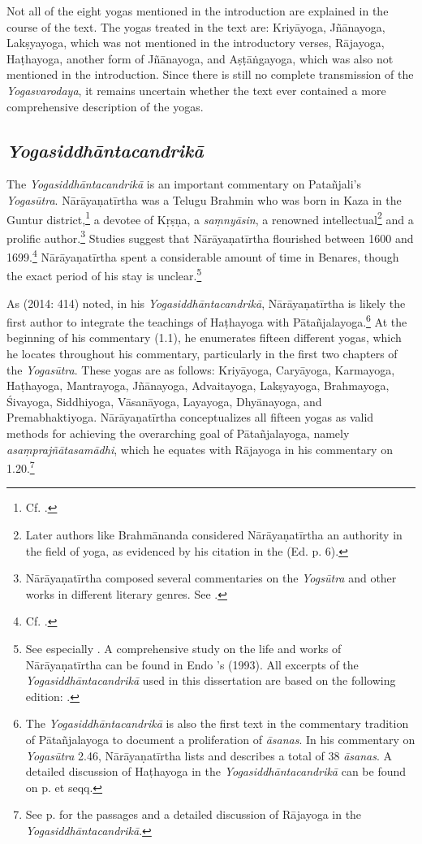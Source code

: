 Not all of the eight yogas mentioned in the introduction are explained in the course of the text. The yogas treated in the text are: Kriyāyoga, Jñānayoga, Lakṣyayoga, which was not mentioned in the introductory verses, Rājayoga, Haṭhayoga, another form of Jñānayoga, and Aṣṭāṅgayoga, which was also not mentioned in the introduction. Since there is still no complete transmission of the \emph{Yogasvarodaya}, it remains uncertain whether the text ever contained a more comprehensive description of the yogas.

\subsection{\emph{Yogasiddhāntacandrikā}}

The \emph{Yogasiddhāntacandrikā} is an important commentary on Patañjali's \emph{Yogasūtra}. Nārāyaṇatīrtha was a Telugu Brahmin who was born in Kaza in the Guntur district,\footnote{Cf. \citeauthor[1993: 43]{endo1993}.} a devotee of Kṛṣṇa, a \textit{saṃnyāsin}, a renowned intellectual\footnote{Later authors like Brahmānanda considered Nārāyaṇatīrtha an authority in the field of yoga, as evidenced by his citation in the  (Ed. p. 6).} and a prolific author.\footnote{Nārāyaṇatīrtha composed several commentaries on the \emph{Yogsūtra} and other works in different literary genres. See \citeauthor[2004: 20-21]{penna2004}.} Studies suggest that Nārāyaṇatīrtha flourished between 1600 and 1699.\footnote{Cf. \citeauthor[1993: 56]{endo1993}.} Nārāyaṇatīrtha spent a considerable amount of time in Benares, though the exact period of his stay is unclear.\footnote{See especially \citeauthor[2004: 24]{penna2004}. A comprehensive study on the life and works of Nārāyaṇatīrtha can be found in Endo \citeauthor{endo1993}'s  (1993). All excerpts of the \emph{Yogasiddhāntacandrikā} used in this dissertation are based on the following edition: .}

As \citeauthor{birch2014} (2014: 414) noted, in his \emph{Yogasiddhāntacandrikā}, Nārāyaṇatīrtha is likely the first author to integrate the teachings of Haṭhayoga with Pātañjalayoga.\footnote{The \emph{Yogasiddhāntacandrikā} is also the first text in the commentary tradition of Pātañjalayoga to document a proliferation of \textit{āsanas}. In his commentary on \emph{Yogasūtra} 2.46, Nārāyaṇatīrtha lists and describes a total of 38 \textit{āsanas}. A detailed discussion of Haṭhayoga in the \emph{Yogasiddhāntacandrikā} can be found on p. \pageref{hathacandrika} et seqq.} At the beginning of his commentary (1.1), he enumerates fifteen different yogas, which he locates throughout his commentary, particularly in the first two chapters of the \emph{Yogasūtra}. These yogas are as follows: Kriyāyoga, Caryāyoga, Karmayoga, Haṭhayoga, Mantrayoga, Jñānayoga, Advaitayoga, Lakṣyayoga, Brahmayoga, Śivayoga, Siddhiyoga, Vāsanāyoga, Layayoga, Dhyānayoga, and Premabhaktiyoga. Nārāyaṇatīrtha conceptualizes all fifteen yogas as valid methods for achieving the overarching goal of Pātañjalayoga, namely \textit{asaṃprajñātasamādhi}, which he equates with Rājayoga in his commentary on 1.20.\footnote{See p. \pageref{rajacandrika} for the passages and a detailed discussion of Rājayoga in the \emph{Yogasiddhāntacandrikā}.}

